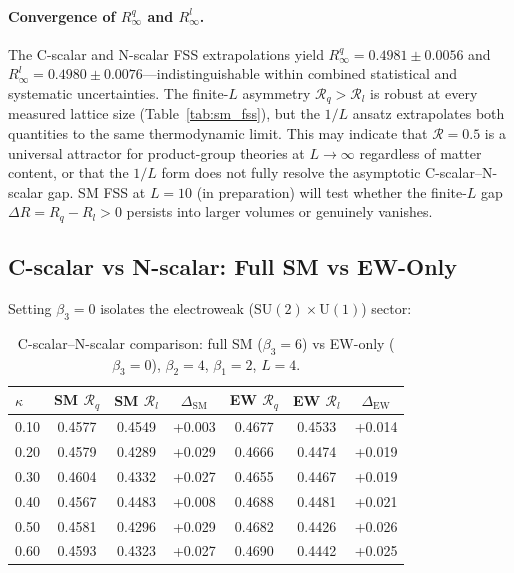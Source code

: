 \documentclass[12pt,a4paper]{article}
\newcommand{\R}{\mathcal{R}}           %
\newcommand{\SU}[1]{\mathrm{SU}(#1)}
\newcommand{\UN}[1]{\mathrm{U}(#1)}
\theoremstyle{plain}
\theoremstyle{definition}
\theoremstyle{remark}
\begin{document}
\paragraph{Convergence of $R_\infty^q$ and $R_\infty^l$.}
The C-scalar and N-scalar FSS extrapolations yield
$R_\infty^q = 0.4981\pm0.0056$ and $R_\infty^l = 0.4980\pm0.0076$---indistinguishable
within combined statistical and systematic uncertainties.
The finite-$L$ asymmetry $\R_q>\R_l$ is robust at every measured lattice size
(Table~\ref{tab:sm_fss}), but the $1/L$ ansatz extrapolates both quantities to the
same thermodynamic limit.
This may indicate that $\R=0.5$ is a universal attractor for product-group theories
at $L\to\infty$ regardless of matter content, or that the $1/L$ form does not fully
resolve the asymptotic C-scalar--N-scalar gap.
SM FSS at $L=10$ (in preparation) will test whether the finite-$L$ gap
$\Delta R = R_q - R_l > 0$ persists into larger volumes or genuinely vanishes.

\subsection{C-scalar vs N-scalar: Full SM vs EW-Only}
\label{sec:sm_qvsl}

Setting $\beta_3=0$ isolates the electroweak ($\SU{2}\times\UN{1}$) sector:

\begin{table}[ht]
\centering
\caption{C-scalar--N-scalar comparison: full SM ($\beta_3=6$) vs EW-only ($\beta_3=0$),
$\beta_2=4$, $\beta_1=2$, $L=4$.}
\label{tab:sm_qvsl}
\begin{tabular}{lcccccc}
\toprule
$\kappa$ & SM $\R_q$ & SM $\R_l$ & $\Delta_\text{SM}$ & EW $\R_q$ & EW $\R_l$ & $\Delta_\text{EW}$ \\
\midrule
0.10 & 0.4577 & 0.4549 & +0.003 & 0.4677 & 0.4533 & +0.014 \\
0.20 & 0.4579 & 0.4289 & +0.029 & 0.4666 & 0.4474 & +0.019 \\
0.30 & 0.4604 & 0.4332 & +0.027 & 0.4655 & 0.4467 & +0.019 \\
0.40 & 0.4567 & 0.4483 & +0.008 & 0.4688 & 0.4481 & +0.021 \\
0.50 & 0.4581 & 0.4296 & +0.029 & 0.4682 & 0.4426 & +0.026 \\
0.60 & 0.4593 & 0.4323 & +0.027 & 0.4690 & 0.4442 & +0.025 \\
\bottomrule
\end{tabular}
\end{table}
\end{document}
